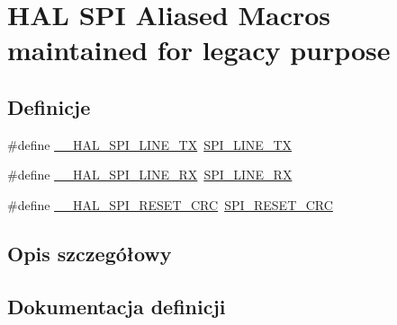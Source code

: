 \hypertarget{group___h_a_l___s_p_i___aliased___macros}{}\section{H\+AL S\+PI Aliased Macros maintained for legacy purpose}
\label{group___h_a_l___s_p_i___aliased___macros}
\subsection*{Definicje}
\begin{DoxyCompactItemize}
\item 
\#define \hyperlink{group___h_a_l___s_p_i___aliased___macros_gab21df59cf07dc6839768a4aed3219801}{\+\_\+\+\_\+\+H\+A\+L\+\_\+\+S\+P\+I\+\_\+L\+I\+N\+E\+\_\+\+TX}~\hyperlink{group___s_p_i___private___macros_gae3b2eb5e818e58b66474d42dedac5523}{S\+P\+I\+\_\+L\+I\+N\+E\+\_\+\+TX}
\item 
\#define \hyperlink{group___h_a_l___s_p_i___aliased___macros_ga34ee4bd3329208207be8fca1f2b6e614}{\+\_\+\+\_\+\+H\+A\+L\+\_\+\+S\+P\+I\+\_\+L\+I\+N\+E\+\_\+\+RX}~\hyperlink{group___s_p_i___private___macros_gaa8d58cef91c1874d5a4dde4014cf6269}{S\+P\+I\+\_\+L\+I\+N\+E\+\_\+\+RX}
\item 
\#define \hyperlink{group___h_a_l___s_p_i___aliased___macros_gaf58ad00b4183d30205773445099d066b}{\+\_\+\+\_\+\+H\+A\+L\+\_\+\+S\+P\+I\+\_\+\+R\+E\+S\+E\+T\+\_\+\+C\+RC}~\hyperlink{group___s_p_i___private___macros_gab120a0085b72939e7d19c4f6b3381a99}{S\+P\+I\+\_\+\+R\+E\+S\+E\+T\+\_\+\+C\+RC}
\end{DoxyCompactItemize}


\subsection{Opis szczegółowy}


\subsection{Dokumentacja definicji}
\mbox{\label{group___h_a_l___s_p_i___aliased___macros_ga34ee4bd3329208207be8fca1f2b6e614}} 
